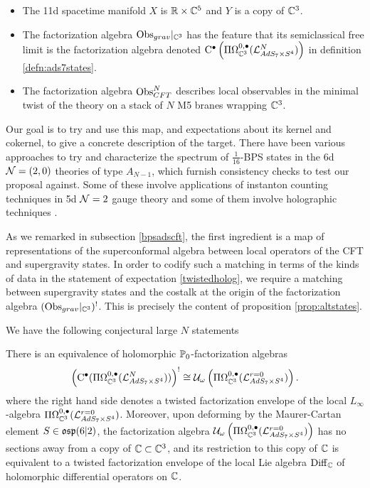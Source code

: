 \begin{itemize}
\item The 11d spacetime manifold $X$ is $\mathbb{R}\times \mathbb{C}^5$ and $Y$ is a copy of $\mathbb{C}^3$. 
\item The factorization algebra $\text{Obs}_{grav}|_{\mathbb{C}^3}$ has the feature that its semiclassical free limit is the factorization algebra denoted ${\mathrm{C}} ^\bullet \left ( \Pi \Omega^{0,\bullet}_{\mathbb{C}^3} (\mathcal{L}^N_{AdS_7\times S^4})\right )$ in definition \ref{defn:ads7states}.
\item The factorization algebra $\text{Obs}^N_{CFT}$ describes local observables in the minimal twist of the theory on a stack of $N$ M5 branes wrapping $\mathbb{C}^3$. 
\end{itemize}

Our goal is to try and use this map, and expectations about its kernel and cokernel, to give a concrete description of the target. There have been various approaches to try and characterize the spectrum of $\frac{1}{16}$-BPS states in the 6d $\mathcal{N}=(2,0)$ theories of type $A_{N-1}$, which furnish consistency checks to test our proposal against. Some of these involve applications of instanton counting techniques in 5d $\mathcal{N}=2$ gauge theory \cite{Kim2013nva} and some of them involve holographic techniques \cite{Imamura}.

As we remarked in subsection \ref{bpsadscft}, the first ingredient is a map of representations of the superconformal algebra between local operators of the CFT and supergravity states. In order to codify such a matching in terms of the kinds of data in the statement of expectation \ref{twistedholog}, we require a matching between supergravity states and the costalk at the origin of the factorization algebra $(\text{Obs}_{grav}|_{\mathbb{C}^3})^!$. This is precisely the content of proposition \ref{prop:altstates}.

\parsec[]

We have the following conjectural large $N$ statements

\begin{conj}\label{conj:classical}
There is an equivalence of holomorphic $\mathbb{P}_0$-factorization algebras \[ \left( {\mathrm{C}}^\bullet (\Pi\Omega^{0,\bullet}_{\mathbb{C}^3} (\mathcal{L}^N_{AdS_7\times S^4}))\right)^!\cong \mathcal{U}_{\omega} \left ( \Pi\Omega^{0,\bullet}_{\mathbb{C}^3} (\mathcal{L}^{r=0}_{AdS_7\times S^4} )\right ).\] where the right hand side denotes a twisted factorization envelope of the local $L_\infty$-algebra $\Pi\Omega^{0,\bullet}_{\mathbb{C}^3} (\mathcal{L}^{r=0}_{AdS_7\times S^4} )$. Moreover, upon deforming by the Maurer-Cartan element $S\in \mathfrak{osp}(6|2)$, the factorization algebra $\mathcal{U}_{\omega} \left ( \Pi\Omega^{0,\bullet}_{\mathbb{C}^3} (\mathcal{L}^{r=0}_{AdS_7\times S^4} )\right )$ has no sections away from a copy of $\mathbb{C}\subset \mathbb{C}^3$, and its restriction to this copy of $\mathbb{C}$ is equivalent to a twisted factorization envelope of the local Lie algebra $\operatorname {Diff}_{\mathbb{C}}$ of holomorphic differential operators on $\mathbb{C}$. 
\end{conj}

